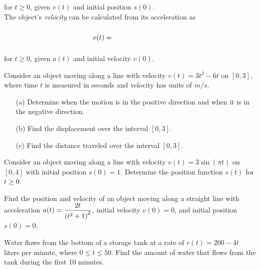 \documentclass[12pt]{article}
\begin{document}
\vspace{1mm}

for $t\geq 0$, given $v(t)$ and initial position $s(0)$.\\

The object's \textit{velocity} can be calculated from its acceleration as

$$v(t)=\phantom{\large{v(0)+\int_0^t a(x)\,dx}}$$

\vspace{1mm}

for $t\geq 0$, given $a(t)$ and initial velocity $v(0)$.

\newpage


\Example Consider an object moving along a line with velocity $v(t)=3t^2-6t$ on $[0,3]$, where time $t$ is measured in seconds and velocity has units of $m/s$.

\begin{enumerate}
\item[(a)] Determine when the motion is in the positive direction and when it is in the negative direction.

\vspace{35mm}

\item[(b)] Find the displacement over the interval $[0,3]$.

\vspace{35mm}

\item[(c)] Find the distance traveled over the interval $[0,3]$.

\vspace{35mm}
\end{enumerate}

\Example Consider an object moving along a line with velocity $v(t)=3\sin\left(\pi t\right)$ on $[0,4]$ with initial position $s(0)=1$. Determine the position function $s(t)$ for $t\geq 0$.

\newpage

\Example Find the position and velocity of an object moving along a straight line with acceleration $a(t)=\displaystyle\frac{2t}{\left( t^2+1\right)^2}$, initial velocity $v(0)=0$, and initial position $s(0)=0$.

\vspace{80mm}

\Example Water flows from the bottom of a storage tank at a rate of $r(t)=200-4t$ liters per minute, where $0\leq t\leq 50$. Find the amount of water that flows from the tank during the first 10 minutes.
\end{document}
